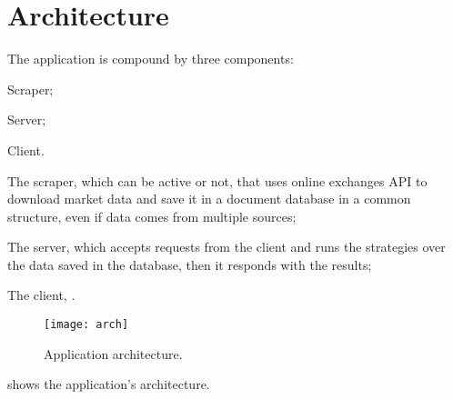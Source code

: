 \chapter{Architecture}\label{ch:arch}

The application is compound by three components:
\begin{enumerate*}[label=]
	\item Scraper;
	\item Server;
	\item Client.
\end{enumerate*}
\begin{enumerate*}[label=(\roman*)]
	\item The scraper, which can be active or not, that uses online
		exchanges API to download market data and save it in a document
		database in a common structure, even if data comes from multiple
		sources;
	\item The server, which accepts requests from the client and runs the
		strategies over the data saved in the database, then it responds
		with the results;
	\item The client, .
\end{enumerate*}

\begin{figure}[p]
	\texttt{[image: arch]}
	\caption{Application architecture.}
	\label{fig:arch}
\end{figure}

 shows the application's architecture.







